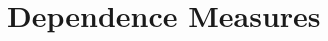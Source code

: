 \documentclass[11pt]{article}
\providecommand{\sct}[1]{{\normalfont\textsc{#1}}}
\newcommand{\subfigimg}[3][,]{%
  \setbox1=\hbox{\texttt{[image: \#3]}}%
  \leavevmode\rlap{\usebox1}%
  \rlap{\hspace*{12pt}\raisebox{\dimexpr\ht1-0\baselineskip}{#2}}%
  \phantom{\usebox1}%
}
\newcommand{\Mgc}{\sct{Mgc}}
\begin{document}


\section{Dependence Measures}
\label{appen:methods}
\end{document}
